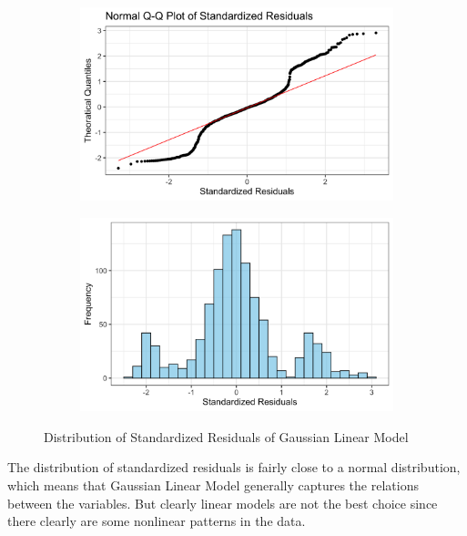 \documentclass{article}
\begin{document}
\begin{figure}[!ht]
	\centering
	
	\begin{subfigure}{0.45\textwidth}
		\centering
		\includegraphics[width=\linewidth]{images/qq_glm.png}
		\label{fig:qq_glm}
	\end{subfigure}
	\hspace{0.05\textwidth} %
	\begin{subfigure}{0.45\textwidth}
		\centering
		\includegraphics[width=\linewidth]{images/his_glm.png}
		\label{fig:his_glm}
	\end{subfigure}
	
	\caption{Distribution of Standardized Residuals of Gaussian Linear Model}
	\label{fig:dis_res_glm}
\end{figure}
The distribution of standardized residuals is fairly close to a normal distribution, which means that Gaussian Linear Model generally captures the relations between the variables. But clearly linear models are not the best choice since there clearly are some nonlinear patterns in the data. 
\end{document}
